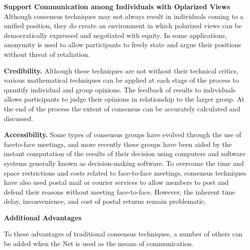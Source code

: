 \documentclass [8pt]{beamer}
\begin{document}
\begin{frame}
\textbf{Support Communication among Individuals with Oplarized Views} Although consensus techniques may not always result in individuals coming to a unified position, they do create an environment in which polarized views can be democratically expressed and negotiated with equity. In some applications, anonymity is used to allow participants to freely state and argue their positions without threat of retaliation.

\textbf{Credibility.} Although these techniques are not without their technical critics, various mathematical techniques can be applied at each stage of the process to quantify individual and group opinions. The feedback of results to individuals allows participants to judge their opinions in relationship to the larger group. At the end of the process the extent of consensus can be accurately calculated and discussed.

\end{frame}
\begin{frame}
  \textbf{Accessibility.} Some types of consensus groups have evolved through the use of faceto-face meetings, and more recently these groups have been aided by the instant computation of the results of their decision using computers and software systems generally known as decision-making software. To overcome the time and space restrictions and costs related to face-to-face meetings, consensus techniques have also used postal mail or courier services to allow members to post and defend their reasons without meeting face-to-face. However, the inherent time delay, inconvenience, and cost of postal returns remain problematic.


\vspace{0.1cm}
{\large\textbf{Additional Advantages}}
\vspace{0.1cm}

To these advantages of traditional consensus techniques, a number of others can be added when the Net is used as the means of communication.
  
\end{frame}
\end{document}
